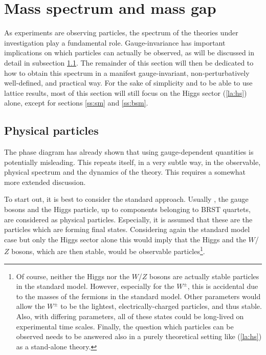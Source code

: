 \documentclass[final,twoside,12pt]{article}
\newcommand*{\pref}[1]{(\ref{#1})}
\newcommand*{\1}{1\!\!\!\bot}
\begin{document}
\section{Mass spectrum and mass gap}\label{s:spectrum}

As experiments are observing particles, the spectrum of the theories under investigation play a fundamental role. Gauge-invariance has important implications on which particles can actually be observed, as will be discussed in detail in subsection \ref{ss:physstates}. The remainder of this section will then be dedicated to how to obtain this spectrum in a manifest gauge-invariant, non-perturbatively well-defined, and practical way. For the sake of simplicity and to be able to use lattice results, most of this section will still focus on the Higgs sector \pref{la:hs} alone, except for sections \ref{ss:sm} and \ref{ss:bsm}.

\subsection{Physical particles}\label{ss:physstates}

The phase diagram has already shown that using gauge-dependent quantities is potentially misleading. This repeats itself, in a very subtle way, in the observable, physical spectrum and the dynamics of the theory. This requires a somewhat more extended discussion.

To start out, it is best to consider the standard approach. Usually \cite{Bohm:2001yx}, the gauge bosons and the Higgs particle, up to components belonging to BRST quartets, are considered as physical particles. Especially, it is assumed that these are the particles which are forming final states. Considering again the standard model case but only the Higgs sector alone this would imply that the Higgs and the $W$/$Z$ bosons, which are then stable, would be observable particles\footnote{Of course, neither the Higgs nor the $W$/$Z$ bosons are actually stable particles in the standard model. However, especially for the $W^\pm$, this is accidental due to the masses of the fermions in the standard model. Other parameters would allow the $W^\pm$ to be the lightest, electrically-charged particles, and thus stable. Also, with differing parameters, all of these states could be long-lived on experimental time scales. Finally, the question which particles can be observed needs to be answered also in a purely theoretical setting like \pref{la:hs} as a stand-alone theory.}.
\end{document}
